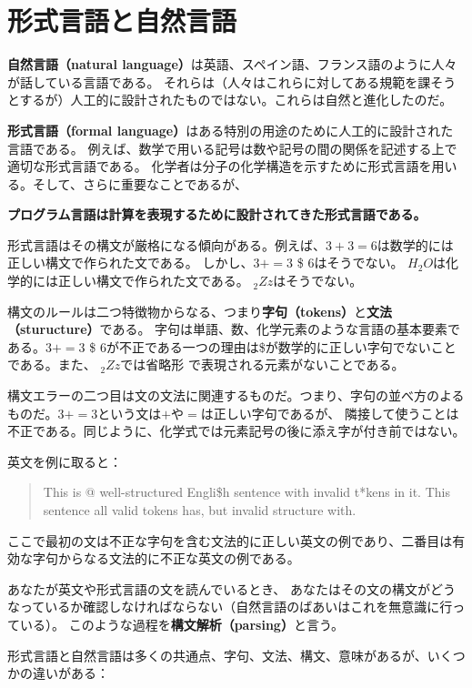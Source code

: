 \documentclass[a4j,12pt,makeidx]{jbook}
\begin{document}
\section{形式言語と自然言語}
{\bf 自然言語（natural language）}は英語、スペイン語、フランス語のように人々が話している言語である。
それらは（人々はこれらに対してある規範を課そうとするが）人工的に設計されたものではない。これらは自然と進化したのだ。\par
{\bf 形式言語（formal language）}はある特別の用途のために人工的に設計された言語である。
例えば、数学で用いる記号は数や記号の間の関係を記述する上で適切な形式言語である。
化学者は分子の化学構造を示すために形式言語を用いる。そして、さらに重要なことであるが、\par
\bigskip
{\bf プログラム言語は計算を表現するために設計されてきた形式言語である。} \par
\bigskip
形式言語はその構文が厳格になる傾向がある。例えば、{$3+3=6$}は数学的には正しい構文で作られた文である。
しかし、{$3 + = 3$ \mbox{\$} $6$}はそうでない。
 {$H_2O$}は化学的には正しい構文で作られた文である。 {$_2Zz$}はそうでない。\par
構文のルールは二つ特徴物からなる、つまり{\bf 字句（tokens）}と{\bf 文法（sturucture）}である。
字句は単語、数、化学元素のような言語の基本要素である。{$3 + = 3$ \mbox{\$} $6$}が不正である一つの理由は\mbox{\$}が数学的に正しい字句でないことである。また、 {$_2Zz$}では省略形 で表現される元素がないことである。\par
構文エラーの二つ目は文の文法に関連するものだ。つまり、字句の並べ方のよるものだ。{$3+=3$}という文は{$+$}や{$=$}は正しい字句であるが、
隣接して使うことは不正である。同じように、化学式では元素記号の後に添え字が付き前ではない。\par
英文を例に取ると：
\begin{quote}
This is @ well-structured Engli\$h
sentence with invalid t*kens in it.  This sentence all valid tokens
has, but invalid structure with.
\end{quote}
ここで最初の文は不正な字句を含む文法的に正しい英文の例であり、二番目は有効な字句からなる文法的に不正な英文の例である。\par
あなたが英文や形式言語の文を読んでいるとき、
あなたはその文の構文がどうなっているか確認しなければならない（自然言語のばあいはこれを無意識に行っている）。
このような過程を{\bf 構文解析（parsing）}と言う。\par
形式言語と自然言語は多くの共通点、字句、文法、構文、意味があるが、いくつかの違いがある：
\end{document}
